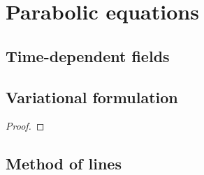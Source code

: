 \section{Parabolic equations}


\subsection{Time-dependent fields}

\begin{remark}
	
\end{remark}

\begin{definition}
	
\end{definition}

\begin{example}
	
\end{example}


\subsection{Variational formulation}

\begin{remark}
	
\end{remark}

\begin{theorem}
	
\end{theorem}

\begin{proof}
	
\end{proof}

\begin{remark}
	
\end{remark}


\subsection{Method of lines}

\begin{definition}
	
\end{definition}

\begin{example}
	
\end{example}

